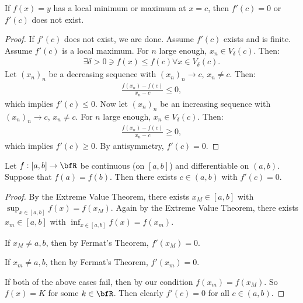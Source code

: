     \begin{theorem}
        If $f(x) = y$ has a local minimum or maximum at $x = c$, then $f'(c) = 0$ or $f'(c)$ does not exist.
    \end{theorem}
        \begin{proof}
            If $f'(c)$ does not exist, we are done. Assume $f'(c)$ exists and is finite. Assume $f'(c)$ is a local maximum. For $n$ large enough, $x_n \in V_\delta(c)$. Then:
                \begin{equation*}
                \begin{split}
                    \exists \delta>0 \ni f(x) \leq f(c) \forall x \in V_\delta(c).
                \end{split}
                \end{equation*}
            Let $(x_n)_n$ be a decreasing sequence with $(x_n)_n \rightarrow c$, $x_n \neq c$. Then:
                \begin{equation*}
                \begin{split}
                    \frac{f(x_n) - f(c)}{x_n - c} \leq 0,
                \end{split}
                \end{equation*}
            which implies $f'(c) \leq 0$. Now let $(x_n)_n$ be an increasing sequence with $(x_n)_n \rightarrow c$, $x_n \neq c$. For $n$ large enough, $x_n \in V_\delta(c)$. Then:
                \begin{equation*}
                \begin{split}
                    \frac{f(x_n) - f(c)}{x_n - c} \geq 0,
                \end{split}
                \end{equation*}
            which implies $f'(c) \geq 0$. By antisymmetry, $f'(c) = 0$.
        \end{proof}

    \begin{theorem}
        Let $f:[a,b] \rightarrow \bfR$ be continuous (on $[a,b]$) and differentiable on $(a,b)$. Suppose that $f(a) = f(b)$. Then there exists $c \in (a,b)$ with $f'(c) = 0$.
    \end{theorem}
        \begin{proof}
            By the Extreme Value Theorem, there exists $x_M \in [a,b]$ with $\sup_{x \in [a,b]}f(x) = f(x_M)$. Again by the Extreme Value Theorem, there exists $x_m \in [a,b]$ with $\inf_{x \in [a,b]}f(x) = f(x_m)$.\nl
            
            If $x_M \neq a,b$, then by Fermat's Theorem, $f'(x_M) = 0$. \nl
            
            If $x_m \neq a,b$, then by Fermat's Theorem, $f'(x_m) = 0$. \nl

            If both of the above cases fail, then by our condition $f(x_m) = f(x_M)$. So $f(x) = K$ for some $k \in \bfR$. Then clearly $f'(c) = 0$ for all $c \in (a,b)$.
        \end{proof}

